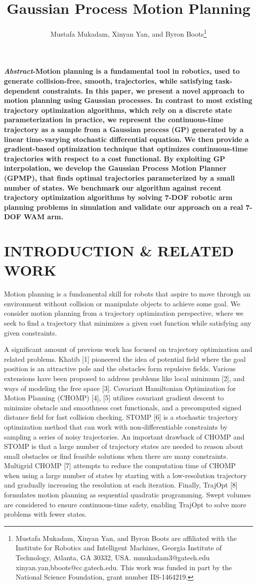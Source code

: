 \documentclass{IEEEtran}
\title{Gaussian Process Motion Planning}
\author{Mustafa Mukadam, Xinyan Yan, and Byron Boots\thanks{Mustafa Mukadam, Xinyan Yan, and Byron Boots are affiliated with
the Institute for Robotics and Intelligent Machines, Georgia Institute
of Technology, Atlanta, GA 30332, USA. mmukadam3@gatech.edu
{xinyan.yan,bboots}@cc.gatech.edu. This work was funded in
part by the National Science Foundation, grant number IIS-1464219.}}
\date{}
\begin{document}
\maketitle
\pagestyle{empty}
\thispagestyle{empty}
 
\textbf{\emph{Abstract}-Motion planning is a fundamental tool in robotics,
used to generate collision-free, smooth, trajectories, while satisfying task-dependent constraints. In this paper, we present a
novel approach to motion planning using Gaussian processes.
In contrast to most existing trajectory optimization algorithms,
which rely on a discrete state parameterization in practice,
we represent the continuous-time trajectory as a sample from
a Gaussian process (GP) generated by a linear time-varying
stochastic differential equation. We then provide a gradient-based optimization technique that optimizes continuous-time
trajectories with respect to a cost functional. By exploiting GP
interpolation, we develop the Gaussian Process Motion Planner
(GPMP), that finds optimal trajectories parameterized by a
small number of states. We benchmark our algorithm against
recent trajectory optimization algorithms by solving 7-DOF
robotic arm planning problems in simulation and validate our
approach on a real 7-DOF WAM arm.}
\section{INTRODUCTION \& RELATED WORK}
Motion planning is a fundamental skill for robots that
aspire to move through an environment without collision
or manipulate objects to achieve some goal. We consider
motion planning from a trajectory optimization perspective,
where we seek to find a trajectory that minimizes a given
cost function while satisfying any given constraints.

A significant amount of previous work has focused on
trajectory optimization and related problems. Khatib [1]
pioneered the idea of potential field where the goal position is
an attractive pole and the obstacles form repulsive fields. Various extensions have been proposed to address problems like
local minimum [2], and ways of modeling the free space [3].
Covariant Hamiltonian Optimization for Motion Planning
(CHOMP) [4], [5] utilizes covariant gradient descent to minimize obstacle and smoothness cost functionals, and a precomputed signed distance field for fast collision checking.
STOMP [6] is a stochastic trajectory optimization method
that can work with non-differentiable constraints by sampling
a series of noisy trajectories. An important drawback of
CHOMP and STOMP is that a large number of trajectory
states are needed to reason about small obstacles or find
feasible solutions when there are many constraints. Multigrid
CHOMP [7] attempts to reduce the computation time of
CHOMP when using a large number of states by starting
with a low-resolution trajectory and gradually increasing the
resolution at each iteration. Finally, TrajOpt [8] formulates
motion planning as sequential quadratic programming. Swept 
volumes are considered to ensure continuous-time safety,
enabling TrajOpt to solve more problems with fewer states.
\end{document}
